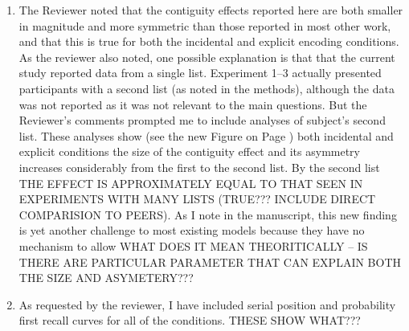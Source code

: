 \documentclass[12pt]{article}
\begin{document}
\begin{enumerate}
\item
	The Reviewer noted that the contiguity effects reported here are both smaller in magnitude and more symmetric than those reported in most other work, and that this is true for both the incidental and explicit encoding conditions. As the reviewer also noted, one possible explanation is that that the current study reported data from a single list. Experiment 1--3 actually presented participants with a second list (as noted in the methods), although the data was not reported as it was not relevant to the main questions. But the Reviewer's comments prompted me to include analyses of subject's second list. These analyses show (see the new Figure on Page \pageref{TODO-6}) both incidental and explicit conditions the size of the contiguity effect and its asymmetry increases considerably from the first to the second list. By the second list THE EFFECT IS APPROXIMATELY EQUAL TO THAT SEEN IN EXPERIMENTS WITH MANY LISTS (TRUE??? INCLUDE DIRECT COMPARISION TO PEERS). As I note in the manuscript, this new finding is yet another challenge to most existing models because they have no mechanism to allow WHAT DOES IT MEAN THEORITICALLY -- IS THERE ARE PARTICULAR PARAMETER THAT CAN EXPLAIN BOTH THE SIZE AND ASYMETERY??? 

\item
	As requested by the reviewer, I have included serial position and probability first recall curves for all of the conditions. THESE SHOW WHAT??? \pageref{TODO-7}



\end{enumerate}


\vspace{20pt}
\end{document}
